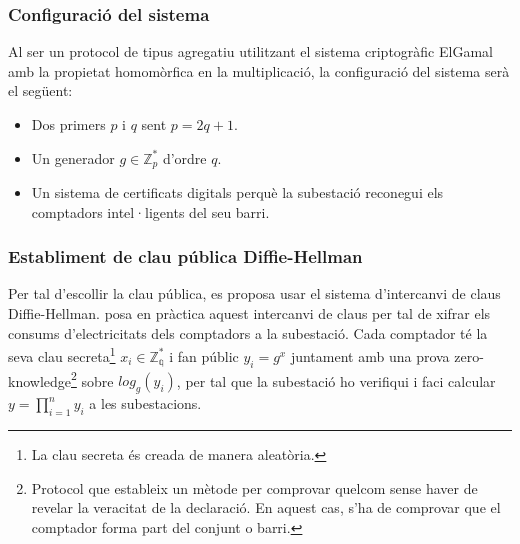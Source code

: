 \subsubsection{Configuració del sistema}
Al ser un protocol de tipus agregatiu utilitzant el sistema criptogràfic ElGamal amb la propietat homomòrfica en la multiplicació, la configuració del sistema serà el següent:
\begin{itemize}
	\item Dos primers $p$ i $q$ sent $p = 2q+1$.
	\item Un generador $g \in \mathbb{Z}_p^*$ d'ordre $q$.
	\item Un sistema de certificats digitals perquè la subestació reconegui els comptadors intel·ligents del seu barri.
\end{itemize}
\subsubsection{Establiment de clau pública Diffie-Hellman}
Per tal d'escollir la clau pública, es proposa usar el sistema d'intercanvi de claus Diffie-Hellman. \cite{busom} posa en pràctica aquest intercanvi de claus per tal de xifrar els consums d'electricitats dels comptadors a la subestació. Cada comptador té la seva clau secreta\footnote{La clau secreta és creada de manera aleatòria.} $x_i \in \mathbb{Z_q^*} $ i fan públic $y_i = g^x$ juntament amb una prova zero-knowledge\footnote{Protocol que estableix un mètode per comprovar quelcom sense haver de revelar la veracitat de la declaració. En aquest cas, s'ha de comprovar que el comptador forma part del conjunt o barri.} sobre $log_g(y_i)$, per tal que la subestació ho verifiqui i faci calcular $y = \prod_{i=1}^{n} y_i$ a les subestacions.
